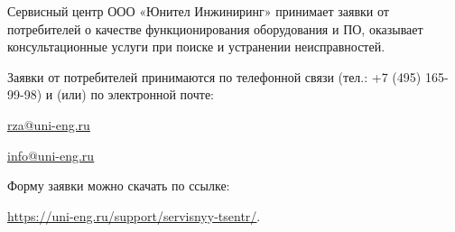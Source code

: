 \documentclass[a4paper, 12pt,table, hidelinks, DIV=calc]{extarticle} %
\begin{document}
\noindent
Сервисный  центр  ООО  «Юнител  Инжиниринг»  принимает  заявки  от  потребителей  о  качестве функционирования  оборудования  и  ПО,  оказывает  консультационные  услуги  при  поиске  и  устранении неисправностей.
\par
\noindent
Заявки от потребителей принимаются  по  телефонной  связи  (тел.:  +7 (495) 165-99-98) и (или) по электронной почте:
\vskip 1mm

\href{mailto:rza@uni-eng.ru}{\color{uniblue}\uline{rza@uni-eng.ru}}
\vskip 1mm

\href{mailto:info@uni-eng.ru}{\color{uniblue}\uline{info@uni-eng.ru}}
\vskip 1mm

\noindent
Форму заявки можно скачать по ссылке: 

\href{https://uni-eng.ru/support/servisnyy-tsentr/}{\color{uniblue}\uline{https://uni-eng.ru/support/servisnyy-tsentr/}}.



\appendixtitleon
\appendixtitletocon


\makeatletter
\renewcommand{\Asbuk}[1]{\expandafter\@Asbuk\csname c@#1\endcsname}
\def\@Asbuk#1{\ifcase#1\or
 А\or Б\or В\or Г\or Д\or Е\or Ж\or И\or К\or Л\or М\or Н\or О\or П\or Р\or С\or Т\or У\or Ф\or Х\or Ц\or Ч\or Ш\or Щ\or Э\or Ю\or Я\else\@ctrerr\fi}
\makeatother
\end{document}

